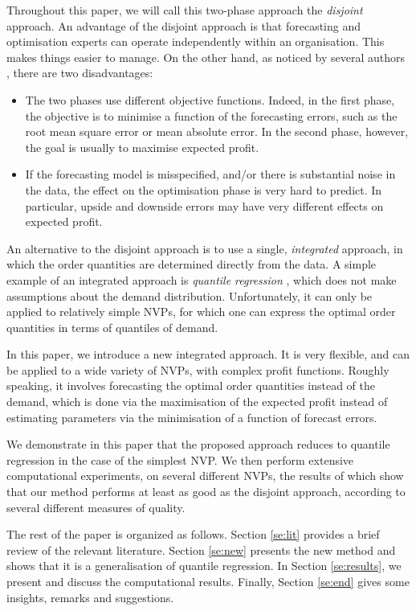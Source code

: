 \documentclass{article}
\begin{document}
Throughout this paper, we will call this two-phase approach the \emph{disjoint} approach. An advantage of the disjoint approach is that forecasting and optimisation experts can operate independently within an organisation. This makes things easier to manage. On the other hand, as noticed by several authors \cite{BT06,BM12,Ka94,KT96,KTB20}, there are two disadvantages:
\begin{itemize}
\item The two phases use different objective functions. Indeed, in the first phase, the objective is to minimise a function of the forecasting errors, such as the root mean square error or mean absolute error. In the second phase, however, the goal is usually to maximise expected profit.
\item If the forecasting model is misspecified, and/or there is substantial noise in the data, the effect on the optimisation phase is very hard to predict. In particular, upside and downside errors may have very different effects on expected profit.
\end{itemize}

An alternative to the disjoint approach is to use a single, \textit{integrated} approach, in which the order quantities are determined directly from the data. A simple example of an integrated approach is \emph{quantile regression} \cite{Br16,Hu19}, which does not make assumptions about the demand distribution. Unfortunately, it can only be applied to relatively simple NVPs, for which one can express the optimal order quantities in terms of quantiles of demand.

In this paper, we introduce a new integrated approach. It is very flexible, and can be applied to a wide variety of NVPs, with complex profit functions. Roughly speaking, it involves forecasting the optimal order quantities instead of the demand, which is done via the maximisation of the expected profit instead of estimating parameters via the minimisation of a function of forecast errors.

We demonstrate in this paper that the proposed approach reduces to quantile regression in the case of the simplest NVP. We then perform extensive computational experiments, on several different NVPs, the results of which show that our method performs at least as good as the disjoint approach, according to several different measures of quality.

The rest of the paper is organized as follows. Section \ref{se:lit} provides a brief review of the relevant literature. Section \ref{se:new} presents the new method and shows that it is a generalisation of quantile regression. In Section \ref{se:results}, we present and discuss the computational results. Finally, Section \ref{se:end} gives some insights, remarks and suggestions.
\end{document}
